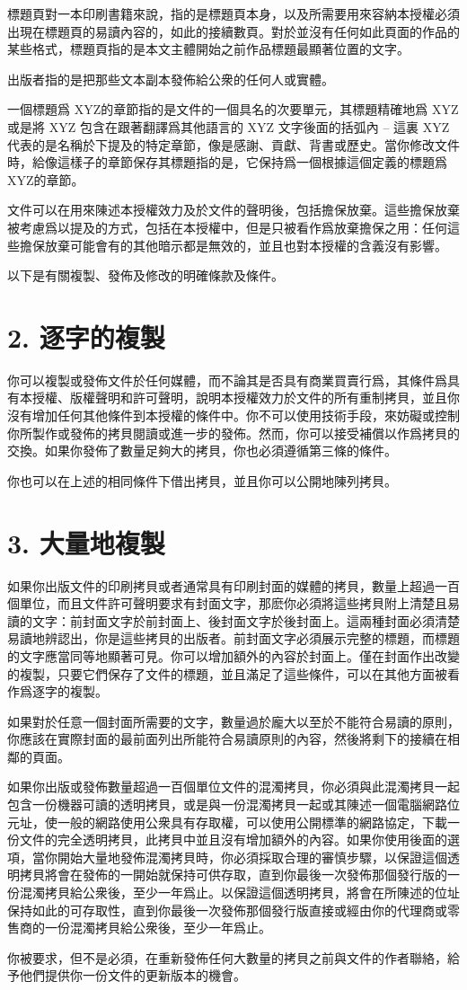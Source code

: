 標題頁對一本印刷書籍來說，指的是標題頁本身，以及所需要用來容納本授權必須出現在標題頁的易讀內容的，如此的接續數頁。對於並沒有任何如此頁面的作品的某些格式，標題頁指的是本文主體開始之前作品標題最顯著位置的文字。\par
出版者指的是把那些文本副本發佈給公衆的任何人或實體。\par
一個標題爲 XYZ的章節指的是文件的一個具名的次要單元，其標題精確地爲 XYZ 或是將 XYZ 包含在跟著翻譯爲其他語言的 XYZ 文字後面的括弧內 -- 這裏 XYZ 代表的是名稱於下提及的特定章節，像是感謝、貢獻、背書或歷史。當你修改文件時，給像這樣子的章節保存其標題指的是，它保持爲一個根據這個定義的標題爲 XYZ的章節。\par
文件可以在用來陳述本授權效力及於文件的聲明後，包括擔保放棄。這些擔保放棄被考慮爲以提及的方式，包括在本授權中，但是只被看作爲放棄擔保之用：任何這些擔保放棄可能會有的其他暗示都是無效的，並且也對本授權的含義沒有影響。\par
以下是有關複製、發佈及修改的明確條款及條件。
\section{2. 逐字的複製}
你可以複製或發佈文件於任何媒體，而不論其是否具有商業買賣行爲，其條件爲具有本授權、版權聲明和許可聲明，說明本授權效力於文件的所有重制拷貝，並且你沒有增加任何其他條件到本授權的條件中。你不可以使用技術手段，來妨礙或控制你所製作或發佈的拷貝閱讀或進一步的發佈。然而，你可以接受補償以作爲拷貝的交換。如果你發佈了數量足夠大的拷貝，你也必須遵循第三條的條件。\par
你也可以在上述的相同條件下借出拷貝，並且你可以公開地陳列拷貝。
\section{3. 大量地複製}
如果你出版文件的印刷拷貝或者通常具有印刷封面的媒體的拷貝，數量上超過一百個單位，而且文件許可聲明要求有封面文字，那麽你必須將這些拷貝附上清楚且易讀的文字：前封面文字於前封面上、後封面文字於後封面上。這兩種封面必須清楚易讀地辨認出，你是這些拷貝的出版者。前封面文字必須展示完整的標題，而標題的文字應當同等地顯著可見。你可以增加額外的內容於封面上。僅在封面作出改變的複製，只要它們保存了文件的標題，並且滿足了這些條件，可以在其他方面被看作爲逐字的複製。\par
如果對於任意一個封面所需要的文字，數量過於龐大以至於不能符合易讀的原則，你應該在實際封面的最前面列出所能符合易讀原則的內容，然後將剩下的接續在相鄰的頁面。\par
如果你出版或發佈數量超過一百個單位文件的混濁拷貝，你必須與此混濁拷貝一起包含一份機器可讀的透明拷貝，或是與一份混濁拷貝一起或其陳述一個電腦網路位元址，使一般的網路使用公衆具有存取權，可以使用公開標準的網路協定，下載一份文件的完全透明拷貝，此拷貝中並且沒有增加額外的內容。如果你使用後面的選項，當你開始大量地發佈混濁拷貝時，你必須採取合理的審慎步驟，以保證這個透明拷貝將會在發佈的一開始就保持可供存取，直到你最後一次發佈那個發行版的一份混濁拷貝給公衆後，至少一年爲止。以保證這個透明拷貝，將會在所陳述的位址保持如此的可存取性，直到你最後一次發佈那個發行版直接或經由你的代理商或零售商的一份混濁拷貝給公衆後，至少一年爲止。\par
你被要求，但不是必須，在重新發佈任何大數量的拷貝之前與文件的作者聯絡，給予他們提供你一份文件的更新版本的機會。
